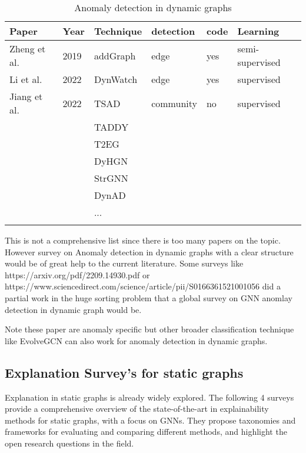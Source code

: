 \begin{table}
\caption{Anomaly detection in dynamic graphs}\label{tab1}
\begin{tabular}{|l|l|l|l|l|l|}
\hline
Paper &  Year & Technique & detection & code & Learning\\
\hline
Zheng et al.\cite{zheng_addgraph_2019} & 2019 & addGraph & edge & yes & semi-supervised\\
Li et al.\cite{li_dynamic_2022} & 2022 & DynWatch  & edge & yes & supervised\\
Jiang et al.\cite{jiang_two-stage_2022} & 2022 & TSAD & community & no & supervised\\
& & TADDY &  & & \\
 & & T2EG &  & & \\
 & & DyHGN &  & & \\
 & & StrGNN &  & & \\
 & & DynAD &  & & \\
 & & ... &  & & \\
 & &  &  & & \\
\hline
\end{tabular}
\end{table}

This is not a comprehensive list since there is too many papers on the topic. However survey on Anomaly detection in dynamic graphs with a clear structure would be of great help to the current literature. Some surveys like https://arxiv.org/pdf/2209.14930.pdf or https://www.sciencedirect.com/science/article/pii/S0166361521001056 did a partial work in the huge sorting problem that a global survey on GNN anomlay detection in dynamic graph would be.

Note these paper are anomaly specific but other broader classification technique like EvolveGCN\cite{egcn} can also work for anomaly detection in dynamic graphs.

\subsection{Explanation Survey's for static graphs}
Explanation in static graphs is already widely explored. The following 4 surveys provide a comprehensive overview of the state-of-the-art in explainability methods for static graphs, with a focus on GNNs. They propose taxonomies and frameworks for evaluating and comparing different methods, and highlight the open research questions in the field.

